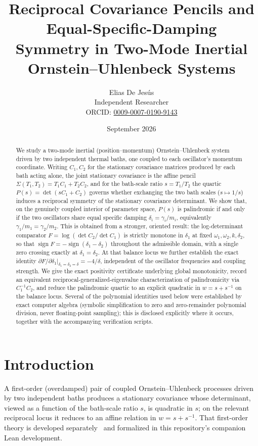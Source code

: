 \documentclass[11pt]{article}
\title{Reciprocal Covariance Pencils and Equal-Specific-Damping\\ Symmetry in Two-Mode Inertial Ornstein--Uhlenbeck Systems}
\author{Elias De Jes\'us\\[2pt] \small Independent Researcher\\[2pt] \small ORCID: \href{https://orcid.org/0009-0007-0190-9143}{0009-0007-0190-9143}}
\date{September 2026}
\theoremstyle{definition}
\begin{document}
\maketitle

\begin{abstract}
We study a two-mode inertial (position--momentum) Ornstein--Uhlenbeck
system driven by two independent thermal baths, one coupled to each
oscillator's momentum coordinate. Writing $C_1,C_2$ for the stationary
covariance matrices produced by each bath acting alone, the joint
stationary covariance is the affine pencil $\Sigma(T_1,T_2)=T_1C_1+T_2C_2$,
and for the bath-scale ratio $s=T_1/T_2$ the quartic
$P(s)=\det(sC_1+C_2)$ governs whether exchanging the two bath scales
($s\mapsto 1/s$) induces a reciprocal symmetry of the stationary
covariance determinant. We show that, on the genuinely coupled interior
of parameter space, $P(s)$ is palindromic if and only if the two
oscillators share equal specific damping $\delta_i=\gamma_i/m_i$,
equivalently $\gamma_1/m_1=\gamma_2/m_2$. This is obtained from a
stronger, oriented result: the log-determinant comparator
$F=\log(\det C_2/\det C_1)$ is strictly monotone in $\delta_1$ at fixed
$\omega_1,\omega_2,k,\delta_2$, so that
$\operatorname{sign}F=-\operatorname{sign}(\delta_1-\delta_2)$
throughout the admissible domain, with a single zero crossing exactly at
$\delta_1=\delta_2$. At that balance locus we further establish the exact
identity $\partial F/\partial\delta_1|_{\delta_1=\delta_2=\delta}=-4/\delta$,
independent of the oscillator frequencies and coupling strength. We give
the exact positivity certificate underlying global monotonicity, record
an equivalent reciprocal-generalized-eigenvalue characterization of
palindromicity via $C_1^{-1}C_2$, and reduce the palindromic quartic to
an explicit quadratic in $w=s+s^{-1}$ on the balance locus. Several of the
polynomial identities used below were established by exact computer
algebra (symbolic simplification to zero and zero-remainder polynomial
division, never floating-point sampling); this is disclosed explicitly
where it occurs, together with the accompanying verification scripts.
\end{abstract}

\section{Introduction}

A first-order (overdamped) pair of coupled Ornstein--Uhlenbeck processes
driven by two independent baths produces a stationary covariance whose
determinant, viewed as a function of the bath-scale ratio $s$, is
quadratic in $s$; on the relevant reciprocal locus it reduces to an
affine relation in $w=s+s^{-1}$. That first-order theory is developed
separately~\cite{dejesus2026heterogeneity} and formalized in this
repository's companion Lean development.
\end{document}
